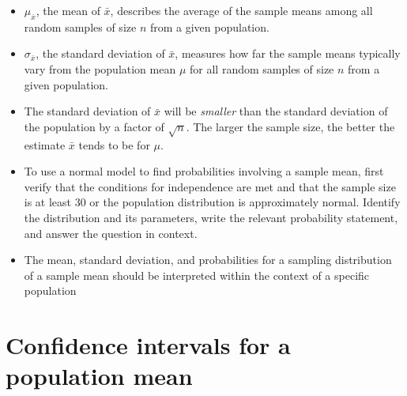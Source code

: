 \begin{itemize}
\item $\mu_{\bar{x}}$, the mean of $\bar{x}$, describes the average of the sample means among all random samples of size $n$ from a given population.  

\item $\sigma_{\bar{x}}$, the standard deviation of $\bar{x}$, measures how far the sample means typically vary from the population mean $\mu$ for all random samples of size $n$ from a given population.  

\item The standard deviation of $\bar{x}$ will be \textit{smaller} than the standard deviation of the population by a factor of $\sqrt{n}$.  The larger the sample size, the better the estimate $\bar{x}$ tends to be for $\mu$.

\item To use a normal model to find probabilities involving a sample mean, first verify that the conditions for independence are met and that the sample size is at least 30 or the population distribution is approximately normal. Identify the distribution and its parameters, write the relevant probability statement, and answer the question in context.

\item The mean, standard deviation, and probabilities for a sampling distribution of a
sample mean should be interpreted within the context of a specific population






\end{itemize}

{}


\section[Confidence intervals for a population mean]{Confidence intervals for a population mean}
\label{oneSampleMeansCI}%


